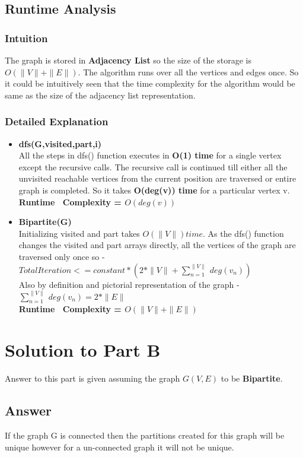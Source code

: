 \documentclass[20pt]{article}
\begin{document}
\newpage
\subsection{Runtime Analysis}
\subsubsection{Intuition}
The graph is stored in \textbf{Adjacency List} so the size of the storage is \\ 
\textbf{$O(\|V\|+\|E\|)$}. The algorithm runs over all the vertices and edges once. So it could be intuitively seen that the time complexity for the algorithm would be same as the size of the adjacency list representation.
\subsubsection{Detailed Explanation}
\begin{itemize}
\item \textbf{dfs(G,visited,part,i)} \\
All the steps in dfs() function executes in \textbf{O(1) time} for a single vertex except the recursive calls. The recursive call is continued till either all the unvisited reachable vertices from the current position are traversed or entire graph is completed. So it takes \textbf{O(deg(v)) time} for a particular vertex v. \\
\textbf{Runtime ~Complexity = $O(deg(v))$}
\item \textbf{Bipartite(G)} \\
Initializing visited and part takes \textbf{$O(\|V\|) time$}. As the dfs() function changes the visited and part arrays directly, all the vertices of the graph are traversed only once so - \\
$Total Iteration <= constant*(2*\|V\|+\sum_{n=1}^{\|V\|}~deg(v_n))$ \\
Also by definition and pictorial representation of the graph - \\
$\sum_{n=1}^{\|V\|}~deg(v_n) = 2*\|E\| $ \\
\textbf{Runtime ~Complexity = $O(\|V\|+\|E\|)$}
\end{itemize}

\newpage
\section{Solution to Part B}
Answer to this part is given assuming the graph $G(V,E)$ to be \textbf{Bipartite}.
\subsection{Answer}
If the graph G is connected then the partitions created for this graph will be unique however for a un-connected graph it will not be unique.
\end{document}
